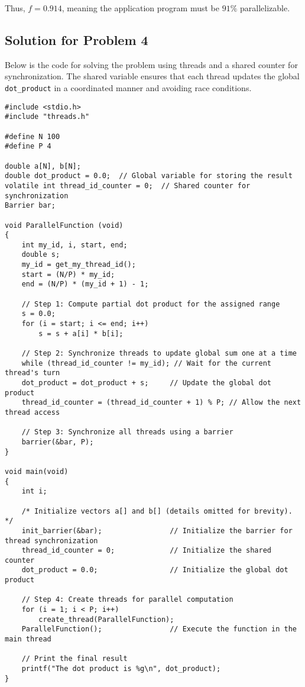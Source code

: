 \documentclass{article}
\begin{document}
Thus, \( f = 0.914 \), meaning the application program must be \( 91\% \) parallelizable.

\subsection*{Solution for Problem 4}

Below is the code for solving the problem using threads and a shared counter for synchronization. The shared variable ensures that each thread updates the global \texttt{dot\_product} in a coordinated manner and avoiding race conditions.

\lstset{style=customc}

\begin{lstlisting}
#include <stdio.h>
#include "threads.h"

#define N 100
#define P 4

double a[N], b[N];
double dot_product = 0.0;  // Global variable for storing the result
volatile int thread_id_counter = 0;  // Shared counter for synchronization
Barrier bar;

void ParallelFunction (void)
{
    int my_id, i, start, end;
    double s;
    my_id = get_my_thread_id();
    start = (N/P) * my_id;
    end = (N/P) * (my_id + 1) - 1;

    // Step 1: Compute partial dot product for the assigned range
    s = 0.0;
    for (i = start; i <= end; i++)
        s = s + a[i] * b[i];

    // Step 2: Synchronize threads to update global sum one at a time
    while (thread_id_counter != my_id); // Wait for the current thread's turn
    dot_product = dot_product + s;     // Update the global dot product
    thread_id_counter = (thread_id_counter + 1) % P; // Allow the next thread access

    // Step 3: Synchronize all threads using a barrier
    barrier(&bar, P);
}

void main(void)
{
    int i;

    /* Initialize vectors a[] and b[] (details omitted for brevity). */
    init_barrier(&bar);                // Initialize the barrier for thread synchronization
    thread_id_counter = 0;             // Initialize the shared counter
    dot_product = 0.0;                 // Initialize the global dot product

    // Step 4: Create threads for parallel computation
    for (i = 1; i < P; i++)
        create_thread(ParallelFunction);
    ParallelFunction();                // Execute the function in the main thread

    // Print the final result
    printf("The dot product is %g\n", dot_product);
}
\end{lstlisting}
\end{document}
